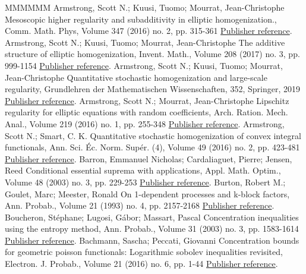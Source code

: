 \begin{thebibliography}{MMMMMM}
 Armstrong, Scott N.; Kuusi, Tuomo; Mourrat, Jean-Christophe Mesoscopic higher regularity and subadditivity in elliptic homogenization., Comm. Math. Phys, Volume 347 (2016) no. 2, pp. 315-361 \href{https://ahl.centre-mersenne.org/item/AHL_2020__3__825_0/#AKM1}{Publisher reference}.
 Armstrong, Scott N.; Kuusi, Tuomo; Mourrat, Jean-Christophe The additive structure of elliptic homogenization, Invent. Math., Volume 208 (2017) no. 3, pp. 999-1154 \href{https://ahl.centre-mersenne.org/item/AHL_2020__3__825_0/#AKM2}{Publisher reference}.
 Armstrong, Scott N.; Kuusi, Tuomo; Mourrat, Jean-Christophe Quantitative stochastic homogenization and large-scale regularity, Grundlehren der Mathematischen Wissenschaften, 352, Springer, 2019 \href{https://ahl.centre-mersenne.org/item/AHL_2020__3__825_0/#AKM-book}{Publisher reference}.
 Armstrong, Scott N.; Mourrat, Jean-Christophe Lipschitz regularity for elliptic equations with random coefficients, Arch. Ration. Mech. Anal., Volume 219 (2016) no. 1, pp. 255-348 \href{https://ahl.centre-mersenne.org/item/AHL_2020__3__825_0/#Armstrong-Mourrat-16}{Publisher reference}.
 Armstrong, Scott N.; Smart, C. K. Quantitative stochastic homogenization of convex integral functionals, Ann. Sci. Éc. Norm. Supér. (4), Volume 49 (2016) no. 2, pp. 423-481 \href{https://ahl.centre-mersenne.org/item/AHL_2020__3__825_0/#Armstrong-Smart-16}{Publisher reference}.
 Barron, Emmanuel Nicholas; Cardaliaguet, Pierre; Jensen, Reed Conditional essential suprema with applications, Appl. Math. Optim., Volume 48 (2003) no. 3, pp. 229-253 \href{https://ahl.centre-mersenne.org/item/AHL_2020__3__825_0/#Barron}{Publisher reference}.
 Burton, Robert M.; Goulet, Marc; Meester, Ronald On 1-dependent processes and k-block factors, Ann. Probab., Volume 21 (1993) no. 4, pp. 2157-2168 \href{https://ahl.centre-mersenne.org/item/AHL_2020__3__825_0/#Burton-Goulet-Meester-93}{Publisher reference}.
 Boucheron, Stéphane; Lugosi, Gábor; Massart, Pascal Concentration inequalities using the entropy method, Ann. Probab., Volume 31 (2003) no. 3, pp. 1583-1614 \href{https://ahl.centre-mersenne.org/item/AHL_2020__3__825_0/#BLM-03}{Publisher reference}.
 Bachmann, Sascha; Peccati, Giovanni Concentration bounds for geometric poisson functionals: Logarithmic sobolev inequalities revisited, Electron. J. Probab., Volume 21 (2016) no. 6, pp. 1-44 \href{https://ahl.centre-mersenne.org/item/AHL_2020__3__825_0/#BachPec}{Publisher reference}.

\end{thebibliography}
